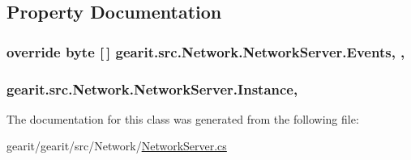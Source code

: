 \subsection{Property Documentation}
\hypertarget{classgearit_1_1src_1_1_network_1_1_network_server_a6a5ae7fa9d299945a9f147ef69ab6c40}{
\subsubsection[{Events}]{\setlength{\rightskip}{0pt plus 5cm}override byte \mbox{[}$\,$\mbox{]} gearit.\+src.\+Network.\+Network\+Server.\+Events\hspace{0.3cm}{\ttfamily [get]}, {\ttfamily [set]}, {\ttfamily [protected]}}}\label{classgearit_1_1src_1_1_network_1_1_network_server_a6a5ae7fa9d299945a9f147ef69ab6c40}
\hypertarget{classgearit_1_1src_1_1_network_1_1_network_server_a0cee12fff2e52615aac32f2f93165ea8}{
\subsubsection[{Instance}]{ gearit.\+src.\+Network.\+Network\+Server.\+Instance\hspace{0.3cm}{\ttfamily [static]}, {\ttfamily [get]}}}\label{classgearit_1_1src_1_1_network_1_1_network_server_a0cee12fff2e52615aac32f2f93165ea8}


The documentation for this class was generated from the following file\+:\begin{DoxyCompactItemize}
\item 
gearit/gearit/src/\+Network/\hyperlink{_network_server_8cs}{Network\+Server.\+cs}\end{DoxyCompactItemize}
